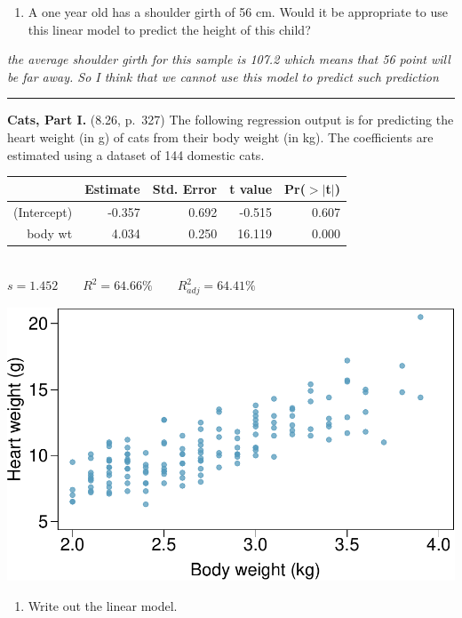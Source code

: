\documentclass[]{article}
\providecommand{\tightlist}{%
  \setlength{\itemsep}{0pt}\setlength{\parskip}{0pt}}
\begin{document}
\begin{enumerate}
\def\labelenumi{(\alph{enumi})}
\setcounter{enumi}{5}
\tightlist
\item
  A one year old has a shoulder girth of 56 cm. Would it be appropriate
  to use this linear model to predict the height of this child?
\end{enumerate}

\emph{the average shoulder girth for this sample is 107.2 which means
that 56 point will be far away. So I think that we cannot use this model
to predict such prediction}

\begin{center}\rule{0.5\linewidth}{\linethickness}\end{center}

\clearpage

\textbf{Cats, Part I.} (8.26, p.~327) The following regression output is
for predicting the heart weight (in g) of cats from their body weight
(in kg). The coefficients are estimated using a dataset of 144 domestic
cats.

\begin{center}
{
\begin{tabular}{rrrrr}
    \hline
            & Estimate  & Std. Error    & t value   & Pr($>$$|$t$|$) \\ 
    \hline
(Intercept) & -0.357    & 0.692         & -0.515    & 0.607 \\ 
body wt     & 4.034     & 0.250         & 16.119    & 0.000 \\ 
    \hline
\end{tabular} \ \\
$s = 1.452 \qquad R^2 = 64.66\% \qquad R^2_{adj} = 64.41\%$ 
}
\end{center}

\begin{center}

\includegraphics[width=0.5\linewidth]{Homework_8_files/figure-latex/unnamed-chunk-3-1} 
\end{center}

\begin{enumerate}
\def\labelenumi{(\alph{enumi})}
\tightlist
\item
  Write out the linear model.
\end{enumerate}
\end{document}
